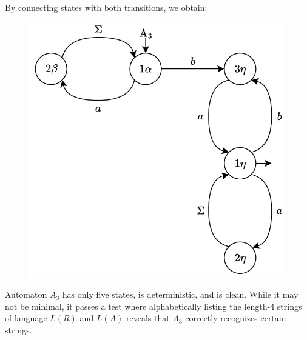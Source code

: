 \begin{enumerate}
\begin{figure}[H]
        \end{figure}
        By connecting states with both transitions, we obtain:
        \begin{figure}[H]
            \centering
            \includegraphics[width=0.5\linewidth]{images/FSA7a.png}
        \end{figure}
        Automaton $A_3$ has only five states, is deterministic, and is clean.
        While it may not be minimal, it passes a test where alphabetically listing the length-4 strings of language $L(R)$ and $L(A)$ reveals that $A_3$ correctly recognizes certain strings.
\end{enumerate}